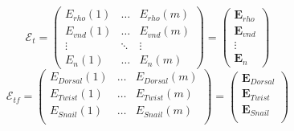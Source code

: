                         \[
  \mathcal{E}_{t}  = \begin{pmatrix}
                         E_{rho}(1) & \ldots & E_{rho}(m) \\
                         	E_{vnd}(1) & \ldots & E_{vnd}(m) \\
                          \vdots& \ddots & \vdots \\
                         E_n(1) & \ldots & E_n(m)
                        \end{pmatrix} =
                        \begin{pmatrix}
                          \textbf{E}_{rho}\\
                          \textbf{E}_{vnd}\\
                           \vdots \\
                      \textbf{E}_n
                        \end{pmatrix} 
                        \]
      \[                  
\mathcal{E}_{tf}  = \begin{pmatrix}
                         E_{Dorsal}(1) & \ldots & E_{Dorsal}(m) \\
                         E_{Twist}(1) & \ldots & E_{Twist}(m) \\
                         E_{Snail}(1) & \ldots & E_{Snail}(m) \\
                        \end{pmatrix} =
                        \begin{pmatrix}
                          \textbf{E}_{Dorsal}\\
                          \textbf{E}_{Twist}\\
                          \textbf{E}_{Snail}\\
                         
                        \end{pmatrix} 
                        \]                        
                        
